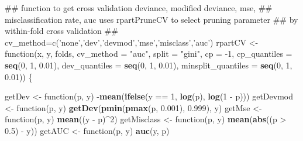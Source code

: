\documentclass[11pt,]{article}
\newenvironment{Shaded}{\begin{snugshade}}{\end{snugshade}}
\newcommand{\KeywordTok}[1]{\textcolor[rgb]{0.13,0.29,0.53}{\textbf{{#1}}}}
\newcommand{\DataTypeTok}[1]{\textcolor[rgb]{0.13,0.29,0.53}{{#1}}}
\newcommand{\DecValTok}[1]{\textcolor[rgb]{0.00,0.00,0.81}{{#1}}}
\newcommand{\FloatTok}[1]{\textcolor[rgb]{0.00,0.00,0.81}{{#1}}}
\newcommand{\StringTok}[1]{\textcolor[rgb]{0.31,0.60,0.02}{{#1}}}
\newcommand{\NormalTok}[1]{{#1}}
\begin{document}
\begin{Shaded}
\begin{Highlighting}[]
{\NormalTok{## function to get cross validation deviance, modified deviance, mse,}
\NormalTok{## misclassification rate, auc uses rpartPruneCV to select pruning parameter}
\NormalTok{## by within-fold cross validation}
\NormalTok{## cv_method=c('none','dev','devmod','mse','misclass','auc')}
\NormalTok{rpartCV <-}\StringTok{ }\NormalTok{function(x, y, folds, }\DataTypeTok{cv_method =} \StringTok{"auc"}\NormalTok{, }\DataTypeTok{split =} \StringTok{"gini"}\NormalTok{, }\DataTypeTok{cp =} \NormalTok{-}\DecValTok{1}\NormalTok{, }
    \DataTypeTok{cp_quantiles =} \KeywordTok{seq}\NormalTok{(}\DecValTok{0}\NormalTok{, }\DecValTok{1}\NormalTok{, }\FloatTok{0.01}\NormalTok{), }\DataTypeTok{dev_quantiles =} \KeywordTok{seq}\NormalTok{(}\DecValTok{0}\NormalTok{, }\DecValTok{1}\NormalTok{, }\FloatTok{0.01}\NormalTok{), }\DataTypeTok{minsplit_quantiles =} \KeywordTok{seq}\NormalTok{(}\DecValTok{0}\NormalTok{, }
        \DecValTok{1}\NormalTok{, }\FloatTok{0.01}\NormalTok{)) \{}
    
    \NormalTok{getDev <-}\StringTok{ }\NormalTok{function(p, y) -}\KeywordTok{mean}\NormalTok{(}\KeywordTok{ifelse}\NormalTok{(y ==}\StringTok{ }\DecValTok{1}\NormalTok{, }\KeywordTok{log}\NormalTok{(p), }\KeywordTok{log}\NormalTok{(}\DecValTok{1} \NormalTok{-}\StringTok{ }\NormalTok{p)))}
    \NormalTok{getDevmod <-}\StringTok{ }\NormalTok{function(p, y) }\KeywordTok{getDev}\NormalTok{(}\KeywordTok{pmin}\NormalTok{(}\KeywordTok{pmax}\NormalTok{(p, }\FloatTok{0.001}\NormalTok{), }\FloatTok{0.999}\NormalTok{), y)}
    \NormalTok{getMse <-}\StringTok{ }\NormalTok{function(p, y) }\KeywordTok{mean}\NormalTok{((y -}\StringTok{ }\NormalTok{p)^}\DecValTok{2}\NormalTok{)}
    \NormalTok{getMisclass <-}\StringTok{ }\NormalTok{function(p, y) }\KeywordTok{mean}\NormalTok{(}\KeywordTok{abs}\NormalTok{((p >}\StringTok{ }\FloatTok{0.5}\NormalTok{) -}\StringTok{ }\NormalTok{y))}
    \NormalTok{getAUC <-}\StringTok{ }\NormalTok{function(p, y) }\KeywordTok{auc}\NormalTok{(y, p)}
    
}
\end{Highlighting}
\end{Shaded}
\end{document}
